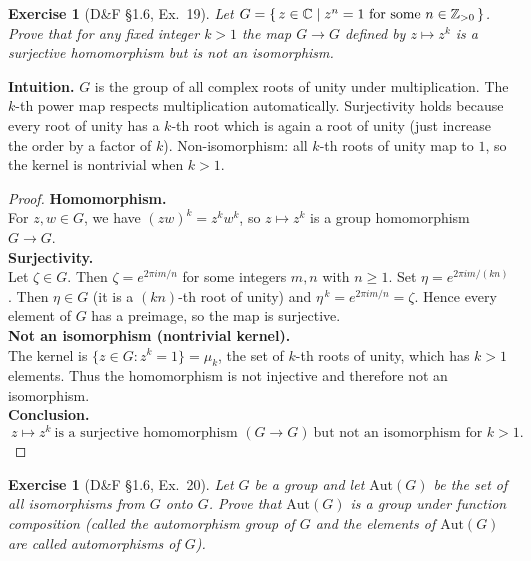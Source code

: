 \documentclass[12pt]{article}
\newtheorem{exercise}[theorem]{Exercise}
\theoremstyle{definition}
\begin{document}
\newpage

\begin{exercise}[D\&F §1.6, Ex.~19]
Let $G=\{\,z\in\Bbb C\mid z^n=1\text{ for some }n\in\Bbb Z_{>0}\,\}$. 
Prove that for any fixed integer $k>1$ the map $G\to G$ defined by $z\mapsto z^{k}$ is a surjective homomorphism but is not an isomorphism.
\end{exercise}

\dotfill

\noindent\textbf{Intuition.}
$G$ is the group of all complex roots of unity under multiplication. 
The $k$-th power map respects multiplication automatically. 
Surjectivity holds because every root of unity has a $k$-th root which is again a root of unity (just increase the order by a factor of $k$). 
Non-isomorphism: all $k$-th roots of unity map to $1$, so the kernel is nontrivial when $k>1$.\\

\dotfill

\begin{proof}
\noindent\textbf{Homomorphism.}\\
\noindent For $z,w\in G$, we have $(zw)^k=z^k w^k$, so $z\mapsto z^k$ is a group homomorphism $G\to G$.\\

\noindent\textbf{Surjectivity.}\\
\noindent Let $\zeta\in G$. Then $\zeta=e^{2\pi i m/n}$ for some integers $m,n$ with $n\ge1$. 
Set $\eta=e^{2\pi i m/(kn)}$. Then $\eta\in G$ (it is a $(kn)$-th root of unity) and $\eta^{\,k}=e^{2\pi i m/n}=\zeta$. 
Hence every element of $G$ has a preimage, so the map is surjective.\\

\noindent\textbf{Not an isomorphism (nontrivial kernel).}\\
\noindent The kernel is $\{z\in G: z^k=1\}=\mu_k$, the set of $k$-th roots of unity, which has $k>1$ elements. 
Thus the homomorphism is not injective and therefore not an isomorphism.\\

\noindent\textbf{Conclusion.}\\
\[
\boxed{\ z\mapsto z^{k}\ \text{is a surjective homomorphism }(G\to G)\ \text{but not an isomorphism for }k>1.\ }
\]
\end{proof}

\newpage

\begin{exercise}[D\&F §1.6, Ex.~20]
Let $G$ be a group and let $\mathrm{Aut}(G)$ be the set of all isomorphisms from $G$ onto $G$. 
Prove that $\mathrm{Aut}(G)$ is a group under function composition (called the automorphism group of $G$ and 
the elements of $\mathrm{Aut}(G)$ are called automorphisms of $G$). %
\end{exercise}
\end{document}

